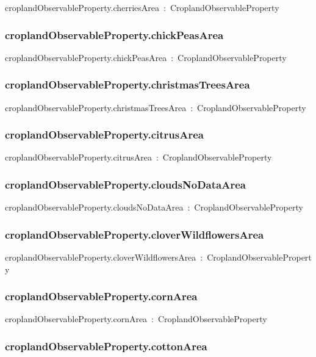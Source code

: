 \documentclass{article}
\begin{document}
croplandObservableProperty.cherriesArea~:~CroplandObservableProperty

\subsubsection*{croplandObservableProperty.chickPeasArea}

croplandObservableProperty.chickPeasArea~:~CroplandObservableProperty

\subsubsection*{croplandObservableProperty.christmasTreesArea}

croplandObservableProperty.christmasTreesArea~:~CroplandObservableProperty

\subsubsection*{croplandObservableProperty.citrusArea}

croplandObservableProperty.citrusArea~:~CroplandObservableProperty

\subsubsection*{croplandObservableProperty.cloudsNoDataArea}

croplandObservableProperty.cloudsNoDataArea~:~CroplandObservableProperty

\subsubsection*{croplandObservableProperty.cloverWildflowersArea}

croplandObservableProperty.cloverWildflowersArea~:~CroplandObservableProperty

\subsubsection*{croplandObservableProperty.cornArea}

croplandObservableProperty.cornArea~:~CroplandObservableProperty

\subsubsection*{croplandObservableProperty.cottonArea}
\end{document}
